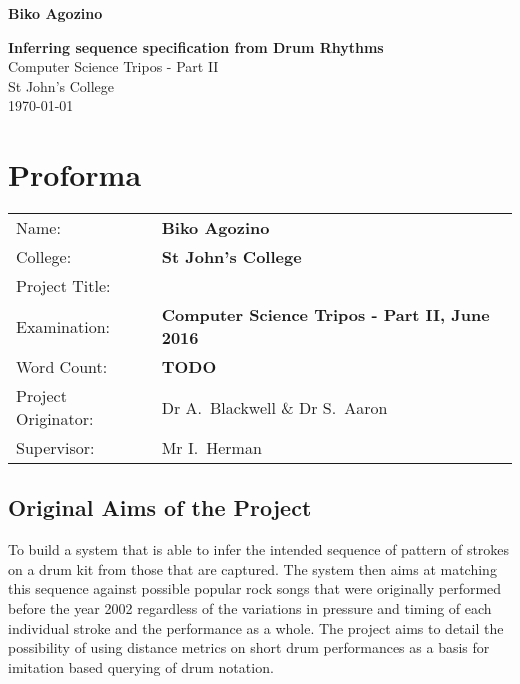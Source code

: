\documentclass[12pt,twoside,notitlepage]{report}
\begin{document}


\pagestyle{empty}

\hfill{\LARGE \bf Biko Agozino}

\vspace*{60mm}
\begin{center}
\Huge
{\bf Inferring sequence specification from Drum Rhythms} \\
\vspace*{5mm}
Computer Science Tripos - Part II \\
\vspace*{5mm}
St John's College \\
\vspace*{5mm}
\today  %
\end{center}

\cleardoublepage


\setcounter{page}{1}
\pagestyle{plain}

\chapter*{Proforma}

{\large
\begin{tabular}{ll}
Name:               & \bf Biko Agozino                       \\
College:            & \bf St John's College                     \\
Project Title:      & \bf  \\
Examination:        & \bf Computer Science Tripos - Part II, June 2016       \\
Word Count:         & \bf TODO \\
Project Originator: & Dr A.~Blackwell \& Dr S.~Aaron                \\
Supervisor:         & Mr I.~Herman                    \\ 
\end{tabular}
}



\section*{Original Aims of the Project}

To build a system that is able to infer the intended sequence of
pattern of strokes on a drum kit from those that are captured. The system then aims at matching this sequence against possible popular rock songs that were originally performed before the year 2002 regardless of the variations in pressure and timing of each individual stroke and the performance as a whole. The project aims to detail the possibility of using distance metrics on short drum performances as a basis for imitation based querying of drum notation.
\end{document}
